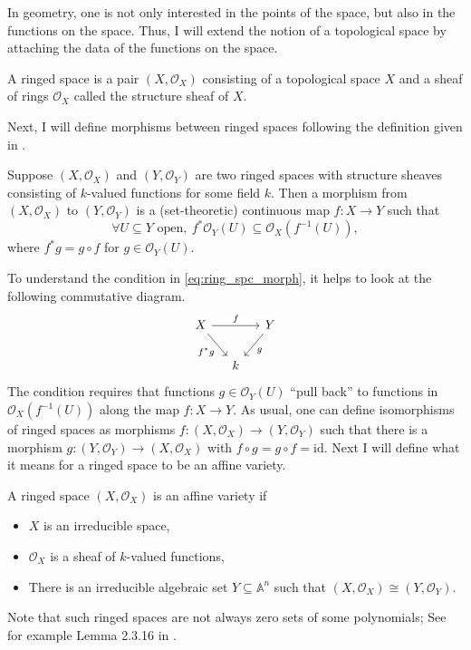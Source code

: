 In geometry, one is not only interested in the points of the space,
but also in the functions on the space. Thus, I will extend the notion of
a topological space by attaching the data of the functions on the space.
\begin{defin}
  A ringed space is a pair $(X,\mathscr{O}_{X})$ consisting of a topological
  space $X$ and a sheaf of rings $\mathscr{O}_{X}$ called the structure
  sheaf of $X$.
\end{defin}
Next, I will define morphisms between ringed spaces following the
definition given in \cite{gathmann}.
\begin{defin}
  Suppose $(X,\mathscr{O}_{X})$ and $(Y,\mathscr{O}_{Y})$ are two ringed
  spaces with structure sheaves consisting of $k$-valued functions
  for some field $k$. Then a morphism from $(X,\mathscr{O}_{X})$ to
  $(Y,\mathscr{O}_{Y})$ is a (set-theoretic) continuous map
  $f:X\to Y$ such that
  \begin{equation}\label{eq:ring_spc_morph}
    \forall U\subseteq Y\text{ open},\ f^{\ast}\mathscr{O}_{Y}(U)
    \subseteq \mathscr{O}_{X}(f^{-1}(U)),
  \end{equation}
  where $f^{\ast}g=g\circ f$ for $g\in\mathscr{O}_{Y}(U)$.
\end{defin}
To understand the condition in \eqref{eq:ring_spc_morph}, it helps to look
at the following commutative diagram.
\[\begin{tikzcd}[column sep=small]
    {X} && {Y} \\
    & k
    \arrow["{f^{\ast}g}"', from=1-1, to=2-2]
    \arrow["g", from=1-3, to=2-2]
    \arrow["f", from=1-1, to=1-3]
  \end{tikzcd}\]
The condition requires that functions $g\in\mathscr{O}_{Y}(U)$ ``pull back''
to functions in \linebreak $\mathscr{O}_{X}(f^{-1}(U))$ along the map $f:X\to Y$. As
usual, one can define isomorphisms of ringed spaces as morphisms
$f:(X,\mathscr{O}_{X})\to (Y,\mathscr{O}_{Y})$ such that there is a morphism
$g:(Y,\mathscr{O}_{Y})\to (X,\mathscr{O}_{X})$ with $f\circ g=g\circ f
=\text{id}$. Next I will define what it means for a ringed space to be
an affine variety.

\begin{defin}
  A ringed space $(X,\mathscr{O}_{X})$ is an affine variety if
  \begin{itemize}
    \item $X$ is an irreducible space,
    \item $\mathscr{O}_{X}$ is a sheaf of $k$-valued functions,
    \item There is an irreducible algebraic set $Y\subseteq \mathbb{A}^{n}$
          such that $(X,\mathscr{O}_{X})\cong (Y,\mathscr{O}_{Y})$.
  \end{itemize}
\end{defin}
Note that such ringed spaces are not always zero sets of some polynomials;
See for example Lemma 2.3.16 in \cite{gathmann}.

